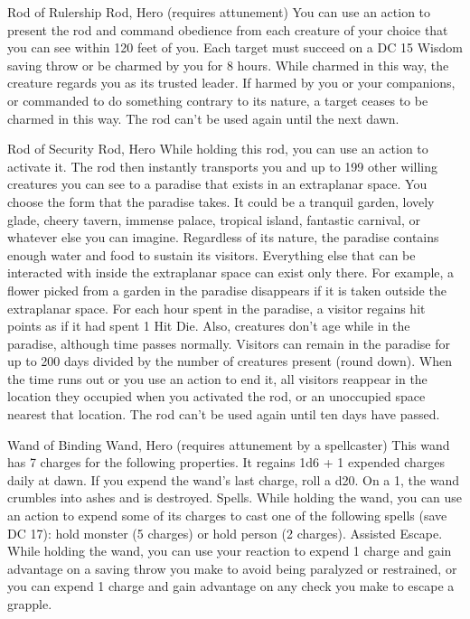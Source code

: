 Rod of Rulership
Rod, Hero (requires attunement)
You can use an action to present the rod and command obedience from each creature of your choice that you can see within 120 feet of you. Each target must succeed on a DC 15 Wisdom saving throw or be charmed by you for 8 hours. While charmed in this way, the creature regards you as its
trusted leader. If harmed by you or your companions, or commanded to do something contrary to its nature, a target ceases to be charmed in this way. The rod can't be used again until the next dawn.

Rod of Security
Rod, Hero While holding this rod, you can use an action to activate it. The rod then instantly transports you and up to 199 other willing creatures you can see to a paradise that exists in an extraplanar space. You choose the form that the paradise takes. It could be a tranquil garden, lovely glade, cheery tavern, immense palace, tropical island, fantastic carnival, or whatever else you can imagine. Regardless of its nature, the paradise contains enough water and food to sustain its visitors. Everything else that can be interacted with inside the extraplanar space can exist only there. For example, a flower picked from a garden in the paradise disappears if it is taken outside the extraplanar space.  For each hour spent in the paradise, a visitor regains hit points as if it had spent 1 Hit Die. Also, creatures don't age while in the paradise, although time passes normally. Visitors can remain in the paradise for up to 200 days divided by the number of creatures present (round down).  When the time runs out or you use an action to end it, all visitors reappear in the location they occupied when you activated the rod, or an unoccupied space nearest that location. The rod can't be used again until ten days have passed.

Wand of Binding
Wand, Hero (requires attunement by a spellcaster) This wand has 7 charges for the following properties. It regains 1d6 + 1 expended charges daily at dawn. If you expend the wand's last charge, roll a d20. On a 1, the wand crumbles into ashes and is destroyed.
Spells. While holding the wand, you can use an action to expend some of its charges to cast one of the following spells (save DC 17): hold monster (5 charges) or hold person (2 charges).
Assisted Escape. While holding the wand, you can use your reaction to expend 1 charge and gain advantage on a saving throw you make to avoid being paralyzed or restrained, or you can expend 1 charge and gain advantage on any check you make to escape a grapple.

